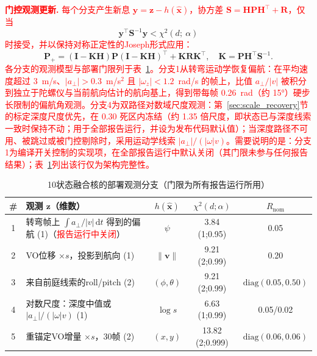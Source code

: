 \textcolor{red}{\textbf{门控观测更新.} 每个分支产生新息 $\mathbf{y} = \mathbf{z} - h(\hat{\mathbf{x}})$，协方差 $\mathbf{S} = \mathbf{H}\mathbf{P}\mathbf{H}^\top + \mathbf{R}$，仅当}
\begin{equation}
    \mathbf{y}^\top \mathbf{S}^{-1} \mathbf{y} < \chi^2(d;\ \alpha)
\end{equation}
\textcolor{red}{时接受，并以保持对称正定性的Joseph形式应用：}
\begin{equation}
    \mathbf{P}_+ = (\mathbf{I} - \mathbf{K}\mathbf{H})\mathbf{P}(\mathbf{I} - \mathbf{K}\mathbf{H})^\top + \mathbf{K}\mathbf{R}\mathbf{K}^\top, \quad \mathbf{K} = \mathbf{P}\mathbf{H}^\top\mathbf{S}^{-1}.
\end{equation}
\textcolor{red}{各分支的观测模型与部署门限列于表~\ref{tab:gating}。分支1从转弯运动学恢复偏航：在平均速度超过 3~m/s、$|a_\perp| > 0.3$~m/s$^2$ 且 $|\omega_z| < 1.2$~rad/s 的帧上，比值 $a_\perp/|v|$ 被积分到独立于陀螺仪与当前航向估计的航向基上，得到带每帧 0.26~rad（约 15°）硬步长限制的偏航角观测。分支4为双路径对数域尺度观测：第~\ref{sec:scale_recovery}节的标定深度尺度优先，在 $0.30$ 死区内冻结\textcolor{red}{（约 1.35 倍尺度，即状态已与深度线索一致时保持不动；用于全部报告运行，并设为发布代码默认值）}；当深度路径不可用、被跳过或被门控剔除时，采用运动学线索 $|a_\perp|/(|\omega|v)$。\textcolor{red}{需要说明的是：分支1为编译开关控制的实现项，在全部报告运行中默认关闭（其门限未参与任何报告结果）；表~\ref{tab:gating}列出该行仅为架构完整性。}}

\begin{table}[!t]
\caption{10状态融合核的部署观测分支（门限为所有报告运行所用）}
\label{tab:gating}
\centering
\begin{tabular}{clccc}
\toprule
\# & 观测 $\mathbf{z}$（维数） & $h(\hat{\mathbf{x}})$ & $\chi^2(d;\alpha)$ & $R_{\mathrm{nom}}$ \\
\midrule
1 & 转弯帧上 $\int a_\perp/|v|\,\mathrm{d}t$ 得到的偏航 (1)（\textcolor{red}{报告运行中关闭}） & $\psi$ & 3.84 (1;0.95) & 0.05 \\
2 & VO位移 $\times s$，投影到航向 (1) & $\|\mathbf{v}\|$ & 9.21 (2;0.99) & 0.20 \\
3 & 来自前庭线索的roll/pitch (2) & $(\phi,\theta)$ & 9.21 (2;0.99) & $\mathrm{diag}(0.05, 0.50)$ \\
4 & 对数尺度：深度中值或 $|a_\perp|/(|\omega|v)$ (1) & $\log s$ & 6.63 (1;0.99) & 0.05/0.02 \\
5 & 重锚定VO增量 $\times s$，30帧 (2) & $(x,y)$ & 13.82 (2;0.999) & $\mathrm{diag}(0.06, 0.06)$ \\
\bottomrule
\end{tabular}
\end{table}


